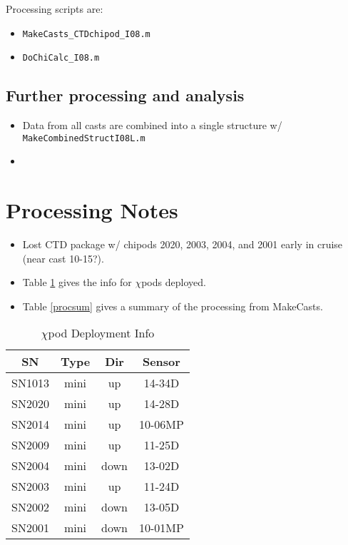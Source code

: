 \documentclass[11pt]{article}
\begin{document}
Processing scripts are:
\begin{itemize}
\item \verb+MakeCasts_CTDchipod_I08.m+
\item \verb+DoChiCalc_I08.m+
\end{itemize}

\subsection{Further processing and analysis}

\begin{itemize}
\item Data from all casts are combined into a single structure w/ \verb+MakeCombinedStructI08L.m+
\item 
\end{itemize}


\newpage
\section{Processing Notes}

\begin{itemize}
\item Lost CTD package w/ chipods 2020, 2003, 2004, and 2001 early in cruise (near cast 10-15?).
\item Table \ref{chidepinfo} gives the info for $\chi$pods deployed.
\item Table \ref{procsum} gives a summary of the processing from MakeCasts.
\end{itemize}


\begin{table}[htdp]
\caption{$\chi$pod Deployment Info}
\begin{center}
\begin{tabular}{|c|c|c|c|}
\hline
SN & Type & Dir & Sensor \\ 
\hline
\hline
SN1013 & mini & up & 14-34D \\ 
SN2020 & mini & up & 14-28D \\ 
SN2014 & mini & up & 10-06MP \\ 
SN2009 & mini & up & 11-25D \\ 
SN2004 & mini & down & 13-02D \\ 
SN2003 & mini & up & 11-24D \\ 
SN2002 & mini & down & 13-05D \\ 
SN2001 & mini & down & 10-01MP \\ 
\hline
\end{tabular}
\end{center}
\label{chidepinfo}
\end{table}%
\end{document}

